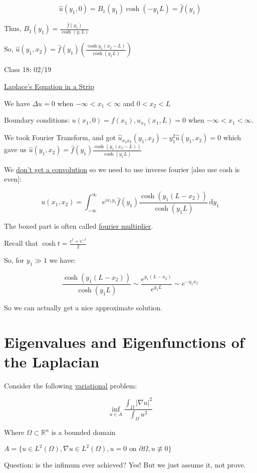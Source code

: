 \documentclass{article}
\theoremstyle{definition}
\begin{document}
\[
    \hat{u}(y_1,0) = B_1(y_1)\cosh(-y_1 L) = \hat{f}(y_1)
\]

Thus, \(B_1(y_1) = \frac{\hat{f}(y_1)}{\cosh(y,L)}\)

So, \(\hat{u}(y_1,x_2) = \hat{f}(y_1)(\frac{\cosh y_1(x_2 - L )}{\cosh(y_1 L)})\) 

\hrulefill

Class 18: 02/19

\underline{Laplace's Equation in a Strip}

We have \(\Delta u = 0\) when \(-\infty < x_1 < \infty \) and \(0 < x_2 < L\) 

Boundary conditions: \(u(x_1,0)=f(x_1),u_{x_2}(x_1,L)=0\) when \(-\infty < x_1 < \infty\).

We took Fourier Transform, and got \(\widehat{u}_{x_2 x_2}(y_1,x_2)-y_1^2\widehat{u}(y_1,x_2)=0\) which gave us \(\widehat{u}(y_1,x_2)=\widehat{f}(y_1)\frac{\cosh(y_1(x_2 - L ))}{\cosh(y_1 L)}\)

We \underline{don't get a convolution} so we need to use inverse fourier [also use cosh is even]:

\[
    u(x_1,x_2)=\int_{-\infty}^{\infty} e^{ix_1 y_1}\widehat{f}(y_1)\boxed{\frac{\cosh(y_1 (L - x_2))}{\cosh(y_1 L)}} \,\mathrm{d}y_1 
\]

The boxed part is often called \underline{fourier multiplier}.

Recall that \(\cosh t = \frac{e^t + e^{-t}}{2}\) 

So, for \(y_1 \gg 1\) we have:

\[
    \frac{\cosh(y_1(L-x_2))}{\cosh(y_1 L)}\sim \frac{e^{y_1(L - x_2)}}{e^{y_1 L}}\sim e^{-y_1 x_2}
\]

So we can actually get a nice approximate solution.

\section*{Eigenvalues and Eigenfunctions of the Laplacian}

Consider the following \underline{variational} problem:

\[
    \inf_{u\in A} \frac{\int_\Omega \vert \nabla u \vert ^2}{\int_\Omega u^2}
\]

Where \(\Omega \subset \mathbb{R}^n\) is a bounded domain

\(A = \{ u\in L^2(\Omega), \nabla u\in L^2(\Omega), u=0 \text{ on }\partial \Omega , u\not\equiv 0  \} \) 

Question: is the infimum ever achieved? Yes! But we just assume it, not prove.
\end{document}
